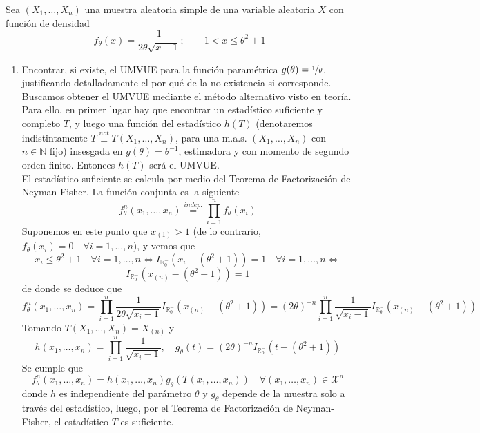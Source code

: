 \documentclass[12pt]{article}
\newcommand{\R}{\mathbb{R}}
\newcommand{\X}{\mathcal{X}}
\newcommand{\N}{\mathbb{N}}
\begin{document}
    \begin{ejercicio}\label{ej:2}
        Sea $(X_1,\ldots,X_n)$ una muestra aleatoria simple de una variable aleatoria $X$ con función de densidad
        \begin{equation*}
            f_\theta(x) = \frac{1}{2\theta\sqrt{x-1}}; \qquad 1<x\leq \theta^2+1
        \end{equation*}
        \begin{enumerate}[label=\alph*)]
            \item Encontrar, si existe, el UMVUE para la función paramétrica $g(\theta) = \nicefrac{1}{\theta}$, justificando detalladamente el por qué de la no existencia si corresponde. \\
            
            Buscamos obtener el UMVUE mediante el método alternativo visto en teoría. Para ello, en primer lugar hay que encontrar un estadístico suficiente y completo $T$, y luego una función del estadístico $h(T)$
            (denotaremos indistintamente $T \stackrel{not}{\equiv} T(X_1, \ldots, X_n)$, para una m.a.s. $(X_1, \ldots, X_n)$ con $n \in \N$ fijo) insesgada en $g(\theta) = \theta^{-1}$, estimadora y con momento de segundo orden finito. Entonces $h(T)$ será el UMVUE. \\

            El estadístico suficiente se calcula por medio del Teorema de Factorización de Neyman-Fisher. La función conjunta es la siguiente
            $$f^n_\theta(x_1, \ldots, x_n) \stackrel{indep.}{=} \prod_{i=1}^{n} f_\theta(x_i)$$
            Suponemos en este punto que $x_{(1)} > 1$ (de lo contrario, $f_\theta(x_i) = 0 \quad \forall i = 1, \ldots, n$), y vemos que 
            $$x_i \leq \theta^2 + 1 \quad \forall i = 1, \ldots, n \iff I_{\R_0^{-}}(x_i - (\theta^2+1)) = 1 \quad \forall i = 1, \ldots, n \iff $$
            $$I_{\R_0^{-}}(x_{(n)} - (\theta^2+1)) = 1$$ de donde se deduce que 
            $$f^n_\theta(x_1, \ldots, x_n) = \prod_{i=1}^{n} \frac{1}{2\theta\sqrt{x_i-1}} I_{\R_0^{-}}(x_{(n)} - (\theta^2+1)) = 
            (2\theta)^{-n} \prod_{i=1}^{n} \frac{1}{\sqrt{x_i-1}} I_{\R_0^{-}}(x_{(n)} - (\theta^2+1))$$
            Tomando $T(X_1, \ldots, X_n) = X_{(n)}$ y 
            $$h(x_1, \ldots, x_n) = \prod_{i=1}^{n} \frac{1}{\sqrt{x_i-1}}, \quad g_\theta(t) = 
            (2\theta)^{-n} I_{\R_0^{-}}(t - (\theta^2+1))$$
            Se cumple que 
            $$f^n_\theta(x_1, \ldots, x_n) = h(x_1, \ldots, x_n) g_\theta(T(x_1, \ldots, x_n)) \quad \forall (x_1, \ldots, x_n) \in \X^n$$
            donde $h$ es independiente del parámetro $\theta$ y $g_\theta$ depende de la muestra solo a través del estadístico, luego,
            por el Teorema de Factorización de Neyman-Fisher, el estadístico $T$ es suficiente. 


\end{enumerate}
\end{ejercicio}
\end{document}
